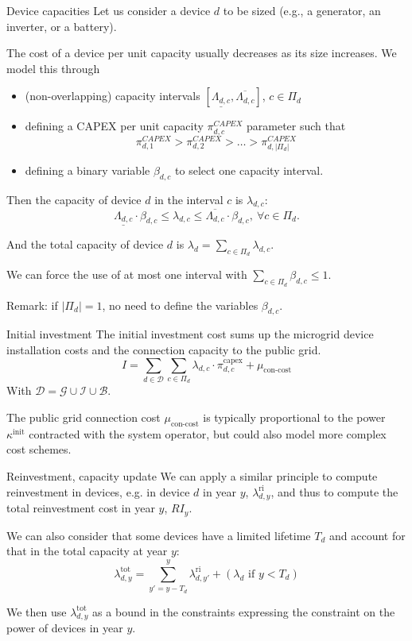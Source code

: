 \begin{frame}[allowframebreaks]{Device capacities}
Let us consider a device $d$ to be sized (e.g., a generator, an inverter, or a battery).

The cost of a device per unit capacity usually decreases as its size increases.
We model this through 
\begin{itemize}
    \item (non-overlapping) capacity intervals $[\underline{\Lambda_{d, c}}, \overline{\Lambda_{d, c}}]$, $c \in \Pi_d$
    \item defining a CAPEX per unit capacity $\pi^{CAPEX}_{d,c}$ parameter such that $$\pi^{CAPEX}_{d,1} > \pi^{CAPEX}_{d,2} > \ldots > \pi^{CAPEX}_{d,|\Pi_d|}$$
    \item defining a binary variable $\beta_{d,c}$ to select one capacity interval.
\end{itemize} 
Then the capacity of device $d$ in the interval $c$ is $\lambda_{d, c}$: 
$$\underline{\Lambda_{d, c}} \cdot \beta_{d, c} \leq \lambda_{d, c}   \leq \overline{\Lambda_{d, c}} \cdot \beta_{d, c}, \ \forall c \in \Pi_d.$$

And the total capacity of device $d$ is 
$\lambda_d   = \sum_{c \in \Pi_d} \lambda_{d,c}$.

We can force the use of at most one interval with 
$\sum_{c \in \Pi_d  } \beta_{d, c} \leq 1.$

Remark: if $|\Pi_d| = 1$, no need to define the variables $\beta_{d,c}$.
\end{frame}



\begin{frame}{Initial investment}
The initial investment cost sums up the microgrid device installation costs and the connection capacity to the public grid.
\begin{equation}
    I = \sum_{d \in \mathcal{D}} \sum_{c \in \Pi_d} \lambda_{d, c} \cdot \pi_{d, c}^{\text{capex}}
    + \mu_{\text{con-cost}}
\end{equation}
With $\mathcal{D} = \mathcal{G} \cup \mathcal{I} \cup \mathcal{B}$.

The public grid connection cost  $\mu_{\text{con-cost}}$ is typically proportional to the power $\kappa^{\text{init}}$ contracted with the system operator, but could also model more complex cost schemes.
\end{frame}


\begin{frame}{Reinvestment, capacity update}
We can apply a similar principle to compute reinvestment in devices, e.g. in device $d$ in year $y$, $\lambda_{d, y}^{\text{ri}}$, and thus to compute the total reinvestment cost in year $y$, $RI_y$. %

We can also consider that some devices have a limited lifetime $T_d$ and account for that in the total capacity at year $y$: 
$$\lambda_{d, y}^{\text{tot}} = \sum_{y'=y-T_d}^y \lambda_{d, y'}^{\text{ri}} + (\lambda_{d} \text{ if } y < T_d)$$

We then use $\lambda_{d, y}^{\text{tot}}$ as a bound in the constraints expressing the constraint on the power of devices in year $y$.
\end{frame}

